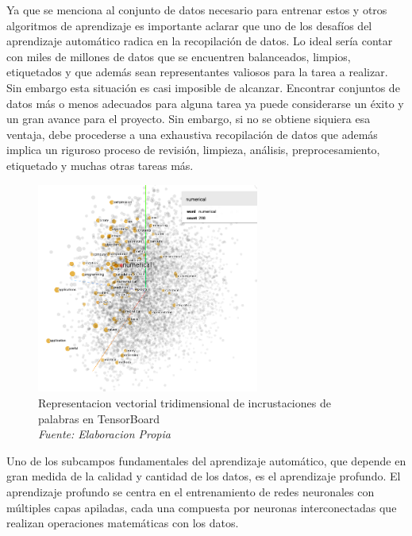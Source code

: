 Ya que se menciona al conjunto de datos necesario para entrenar estos y otros algoritmos de aprendizaje es importante aclarar que uno de los desafíos del aprendizaje automático radica en la recopilación de datos. Lo ideal sería contar con miles de millones de datos que se encuentren balanceados, limpios, etiquetados y que además sean representantes valiosos para la tarea a realizar. Sin embargo esta situación es casi imposible de alcanzar. Encontrar conjuntos de datos más o menos adecuados para alguna tarea ya puede considerarse un éxito y un gran avance para el proyecto. Sin embargo, si no se obtiene siquiera esa ventaja, debe procederse a una exhaustiva recopilación de datos que además implica un riguroso proceso de revisión, limpieza, análisis, preprocesamiento, etiquetado y muchas otras tareas más.

\begin{figure}[h!]
	\includegraphics[width=0.65\textwidth]{capitulo2/figuras/an1.png}
	\caption[Representacion vectorial tridimensional de incrustaciones de palabras en TensorBoard]{Representacion vectorial tridimensional de incrustaciones de palabras en TensorBoard
		\\\textit{Fuente: Elaboracion Propia}}
	\label{fig:tensorboard}
\end{figure}

Uno de los subcampos fundamentales del aprendizaje automático, que depende en gran medida de la calidad y cantidad de los datos, es el aprendizaje profundo. El aprendizaje profundo se centra en el entrenamiento de redes neuronales con múltiples capas apiladas, cada una compuesta por neuronas interconectadas que realizan operaciones matemáticas con los datos.

